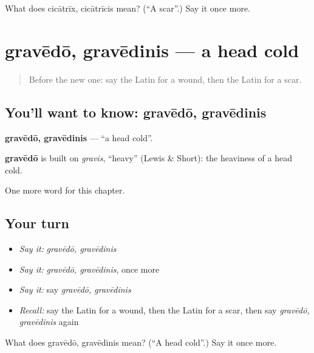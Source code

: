 \begin{tcolorbox}[breakable,colback=teal!4,colframe=teal!35!black,title={Before you move on}]
What does cicātrīx, cicātrīcis mean? (\textquotedblleft{}A scar\textquotedblright{}.) Say it once more.
\end{tcolorbox}
\section[gravēdō, gravēdinis]{gravēdō, gravēdinis — a head cold}

\label{lesson:LA-C205-gravedo}



\begin{quote}
Before the new one: say the Latin for a wound, then the Latin for a scar.
\end{quote}

\subsection*{You'll want to know: gravēdō, gravēdinis}
\textbf{gravēdō, gravēdinis} — \textquotedblleft{}a head cold\textquotedblright{}.

\begin{cousinweb}
\textbf{gravēdō} is built on \emph{gravis}, \textquotedblleft{}heavy\textquotedblright{} (Lewis \& Short): the heaviness of a head cold.
\end{cousinweb}

\begin{grammarlens}[title={What you've built}]
One more word for this chapter.
\end{grammarlens}

\subsection*{Your turn}
\begin{itemize}
\raggedright
  \item \emph{Say it:} \emph{gravēdō, gravēdinis}
  \item \emph{Say it:} \emph{gravēdō, gravēdinis}, once more
  \item \emph{Say it:} say \emph{gravēdō, gravēdinis}
  \item \emph{Recall:} say the Latin for a wound, then the Latin for a scar, then say \emph{gravēdō, gravēdinis} again
\end{itemize}

\begin{tcolorbox}[breakable,colback=teal!4,colframe=teal!35!black,title={Before you move on}]
What does gravēdō, gravēdinis mean? (\textquotedblleft{}A head cold\textquotedblright{}.) Say it once more.
\end{tcolorbox}
